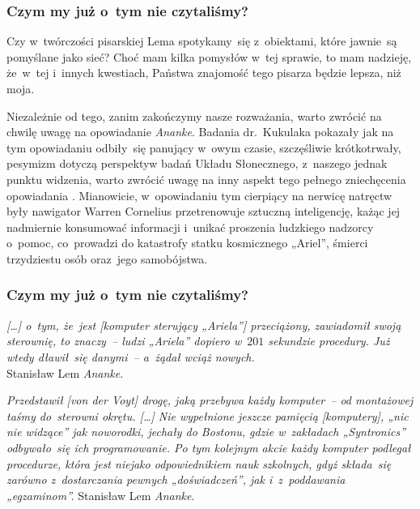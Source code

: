 \documentclass[10pt,t]{beamer}
\begin{document}
\begin{frame}
  \frametitle{Czym my już o~tym nie czytaliśmy?}


  Czy w~twórczości pisarskiej Lema spotykamy~się z~obiektami, które
  jawnie~są pomyślane jako sieć? Choć mam kilka pomysłów w~tej sprawie, to
  mam nadzieję, że~w~tej i~innych kwestiach, Państwa znajomość tego pisarza
  będzie lepsza, niż moja.

  Niezależnie od tego, zanim zakończymy nasze rozważania, warto zwrócić na
  chwilę uwagę na opowiadanie \textit{Ananke}. Badania dr.~Kukulaka
  pokazały jak na tym opowiadaniu odbiły~się panujący w~owym czasie,
  szczęśliwie krótkotrwały, pesymizm
  dotyczą perspektyw badań Układu Słonecznego, z~naszego jednak punktu
  widzenia, warto zwrócić uwagę na inny aspekt tego pełnego zniechęcenia
  opowiadania \parencite{Kukulak-Two-Faces-of-Mars-Pub-2023}.
  Mianowicie, w~opowiadaniu tym cierpiący na nerwicę natręctw były
  nawigator Warren Cornelius przetrenowuje sztuczną inteligencję, każąc jej
  nadmiernie konsumować informacji i~unikać proszenia ludzkiego nadzorcy
  o~pomoc, co~prowadzi do katastrofy statku kosmicznego „Ariel”, śmierci
  trzydziestu osób oraz~jego samobójstwa.

\end{frame}





\begin{frame}
  \frametitle{Czym my już o~tym nie czytaliśmy?}


  \textit{[\ldots] o~tym, że~jest [komputer sterujący „Ariela”] przeciążony,
    zawiadomił swoją sterownię, to znaczy~-- ludzi „Ariela” dopiero w~$201$
    sekundzie procedury. Już wtedy dławił~się danymi~-- a~żądał wciąż
    nowych.} \\
  Stanisław Lem \textit{Ananke}.

  \textit{Przedstawił [von der Voyt] drogę, jaką przebywa każdy komputer~--
    od montażowej taśmy do~sterowni okrętu. [\ldots] Nie wypełnione jeszcze
    pamięcią [komputery], „nic nie widzące” jak noworodki, jechały do
    Bostonu, gdzie w~zakładach „Syntronics” odbywało~się ich programowanie.
    Po tym kolejnym akcie każdy komputer podlegał procedurze, która jest
    niejako odpowiednikiem nauk szkolnych, gdyż składa~się zarówno
    z~dostarczania pewnych „doświadczeń”, jak i~z~poddawania „egzaminom”.}
  Stanisław Lem \textit{Ananke}.

\end{frame}
\end{document}

